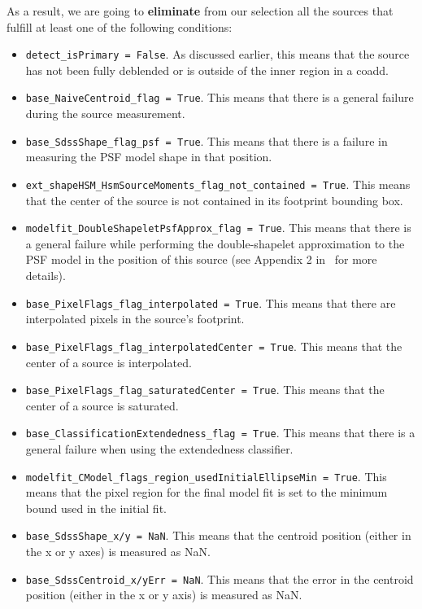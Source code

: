 \documentclass[twocolumn]{aastex62}
\begin{document}
As a result, we are going to \textbf{eliminate} from our selection all the sources that fulfill at least one of the following conditions:
\begin{itemize}
\item \texttt{detect\_isPrimary = False}. As discussed earlier, this means that the source has not been fully deblended or is outside of the inner region in a coadd.
\item \texttt{base\_NaiveCentroid\_flag = True}. This means that there is a general failure during the source measurement.
\item \texttt{base\_SdssShape\_flag\_psf = True}. This means that there is a failure in measuring the PSF model shape in that position.
\item \texttt{ext\_shapeHSM\_HsmSourceMoments\_flag\_not\_contained = True}. This means that the center of the source is not contained in its footprint bounding box.
\item \texttt{modelfit\_DoubleShapeletPsfApprox\_flag = True}. This means that there is a general failure while performing the double-shapelet approximation to the PSF model in the position of this source (see Appendix 2 in~\citet{2018PASJ...70S...5B} for more details).
\item \texttt{base\_PixelFlags\_flag\_interpolated = True}. This means that there are interpolated pixels in the source's footprint.
\item \texttt{base\_PixelFlags\_flag\_interpolatedCenter = True}. This means that the center of a source is interpolated.
\item \texttt{base\_PixelFlags\_flag\_saturatedCenter = True}. This means that the center of a source is saturated.
\item \texttt{base\_ClassificationExtendedness\_flag = True}. This means that there is a general failure when using the extendedness classifier.
\item \texttt{modelfit\_CModel\_flags\_region\_usedInitialEllipseMin = True}. This means that the pixel region for the final model fit is set to the minimum bound used in the initial fit.
\item \texttt{base\_SdssShape\_x/y = NaN}. This means that the centroid position (either in the x or y axes) is measured as NaN.
\item \texttt{base\_SdssCentroid\_x/yErr = NaN}. This means that the error in the centroid position (either in the x or y axis) is measured as NaN.
\end{itemize}
\end{document}
